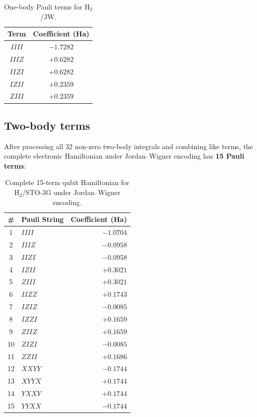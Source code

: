 \documentclass[aps,prb,preprint,longbibliography,nofootinbib]{revtex4-2}
\begin{document}
\begin{table}[h]
\centering
\begin{tabular}{@{}cc@{}}
\toprule
\textbf{Term} & \textbf{Coefficient (Ha)} \\
\midrule
$IIII$ & $-1.7282$ \\
$IIIZ$ & $+0.6282$ \\
$IIZI$ & $+0.6282$ \\
$IZII$ & $+0.2359$ \\
$ZIII$ & $+0.2359$ \\
\bottomrule
\end{tabular}
\caption{One-body Pauli terms for H$_2$/JW.}
\label{tab:one-body-pauli}
\end{table}

\subsection{Two-body terms}

After processing all 32 non-zero two-body integrals and combining like
terms, the complete electronic Hamiltonian under Jordan--Wigner encoding
has \textbf{15 Pauli terms}:

\begin{table}[h]
\centering
\begin{tabular}{@{}clr@{}}
\toprule
\# & \textbf{Pauli String} & \textbf{Coefficient (Ha)} \\
\midrule
 1 & $IIII$ & $-1.0704$ \\
 2 & $IIIZ$ & $-0.0958$ \\
 3 & $IIZI$ & $-0.0958$ \\
 4 & $IZII$ & $+0.3021$ \\
 5 & $ZIII$ & $+0.3021$ \\
 6 & $IIZZ$ & $+0.1743$ \\
 7 & $IZIZ$ & $-0.0085$ \\
 8 & $IZZI$ & $+0.1659$ \\
 9 & $ZIIZ$ & $+0.1659$ \\
10 & $ZIZI$ & $-0.0085$ \\
11 & $ZZII$ & $+0.1686$ \\
12 & $XXYY$ & $-0.1744$ \\
13 & $XYYX$ & $+0.1744$ \\
14 & $YXXY$ & $+0.1744$ \\
15 & $YYXX$ & $-0.1744$ \\
\bottomrule
\end{tabular}
\caption{Complete 15-term qubit Hamiltonian for H$_2$/STO-3G under
  Jordan--Wigner encoding.}
\label{tab:full-hamiltonian}
\end{table}
\end{document}
